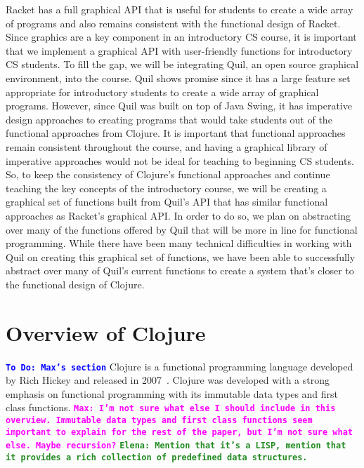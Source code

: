\documentclass[12pt]{article}
\newcommand{\comment}[1]{{\bf \tt  {#1}}}
\newcommand{\emcomment}[1]{\textcolor{ForestGreen}{\comment{Elena: {#1}}}}
\newcommand{\todo}[1]{\textcolor{blue}{\comment{To Do: {#1}}}}
\newcommand{\mmcomment}[1]{\textcolor{magenta}{\comment{Max: {#1}}}}
\begin{document}
Racket has a full graphical API that is useful for students to create a wide array of programs and also remains consistent with the functional design of Racket. Since graphics are a key component in an introductory CS course, it is important that we implement a graphical API with user-friendly functions for introductory CS students. To fill the gap, we will be integrating Quil, an open source graphical environment, into the course. Quil shows promise since it has a large feature set appropriate for introductory students to create a wide array of graphical programs. However, since Quil was built on top of Java Swing, it has imperative design approaches to creating programs that would take students out of the functional approaches from Clojure. It is important that functional approaches remain consistent throughout the course, and having a graphical library of imperative approaches would not be ideal for teaching to beginning CS students. So, to keep the consistency of Clojure’s functional approaches and continue teaching the key concepts of the introductory course, we will be creating a graphical set of functions built from Quil’s API that has similar functional approaches as Racket’s graphical API. In order to do so, we plan on abstracting over many of the functions offered by Quil that will be more in line for functional programming. While there have been many technical difficulties in working with Quil on creating this graphical set of functions, we have been able to successfully abstract over many of Quil’s current functions to create a system that’s closer to the functional design of Clojure. 

\section{Overview of Clojure}\label{sec:clojure}
\todo{Max's section}
Clojure is a functional programming language developed by Rich Hickey and released in 2007~\cite{Hickey:2008}. Clojure was developed with a strong emphasis on functional programming with its immutable data types and first class functions.
\mmcomment{I'm not sure what else I should include in this overview. Immutable data types and first class functions seem important to explain for the rest of the paper, but I'm not sure what else. Maybe recursion?}
\emcomment{Mention that it's a LISP, mention that it provides a rich collection of predefined data structures.}
\end{document}
